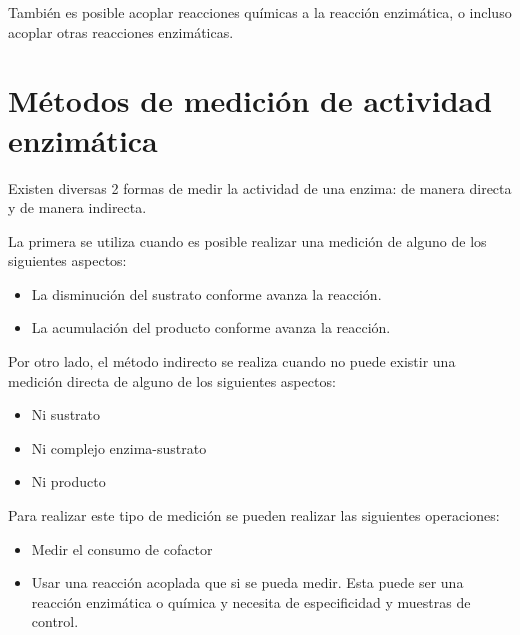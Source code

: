 También es posible acoplar reacciones químicas a la reacción enzimática, o incluso acoplar otras reacciones enzimáticas.

\section{Métodos de medición de actividad enzimática}

Existen diversas 2 formas de medir la actividad de una enzima: de manera directa y de manera indirecta.

La primera se utiliza cuando es posible realizar una medición de alguno de los siguientes aspectos:

\begin{itemize}
    \item La disminución del sustrato conforme avanza la reacción.
    \item La acumulación del producto conforme avanza la reacción.
\end{itemize}

Por otro lado, el método indirecto se realiza cuando no puede existir una medición directa de alguno de los siguientes aspectos:

\begin{itemize}
    \item Ni sustrato
    \item Ni complejo enzima-sustrato
    \item Ni producto
\end{itemize}

Para realizar este tipo de medición se pueden realizar las siguientes operaciones:

\begin{itemize}
    \item Medir el consumo de cofactor
    \item Usar una reacción acoplada que si se pueda medir. Esta puede ser una reacción enzimática o química y necesita de especificidad y muestras de control.
\end{itemize}

